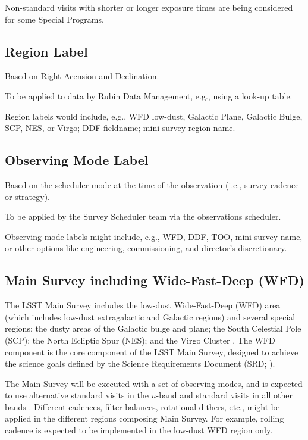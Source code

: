 Non-standard visits with shorter or longer exposure times are being 
considered for some Special Programs.

\subsection{Region Label}

Based on Right Acension and Declination.

To be applied to data by Rubin Data Management, e.g., using a look-up table.

Region labels would include, e.g., WFD low-dust, Galactic Plane, Galactic 
Bulge, SCP, NES, or Virgo; DDF fieldname; mini-survey region name.

\subsection{Observing Mode Label}

Based on the scheduler mode at the time of the observation
(i.e., survey cadence or strategy).

To be applied by the Survey Scheduler team via the observations scheduler.

Observing mode labels might include, e.g., WFD, DDF, TOO, mini-survey name, or other 
options like engineering, commissioning, and director's discretionary.

\subsection{Main Survey including Wide-Fast-Deep (WFD)}

The LSST Main Survey includes the low-dust Wide-Fast-Deep (WFD) area 
(which includes low-dust extragalactic and Galactic regions) 
and several special regions:
the dusty areas of the Galactic bulge and plane; the South Celestial Pole (SCP); 
the North Ecliptic Spur (NES); and the Virgo Cluster .
The WFD component is the core component of the LSST Main Survey, designed to achieve the science 
goals defined by the Science Requirements Document (SRD; ).

The Main Survey will be executed with a set of observing modes, and 
is expected to use alternative standard visits in the $u$-band and 
standard visits in all other bands .
Different cadences, filter balances, rotational dithers, etc., 
might be applied in the different regions composing Main Survey.
For example, rolling cadence is expected to be implemented in the low-dust 
WFD region only.

